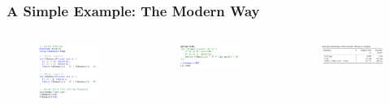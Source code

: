 \documentclass{beamer}
\begin{document}

\begin{frame}
\frametitle{A Simple Example: The Modern Way}
\begin{columns}
\begin{figure}[htb]
    \centering
    \includegraphics[width=1\textwidth]{new-way-2.png}
\end{figure} \pause
{}
\begin{figure}[htb]
    \centering
    \includegraphics[width=1\textwidth]{new-way-1.png}
\end{figure} \pause
\begin{figure}[htb]
    \centering
    \includegraphics[width=1\textwidth]{results.png}
\end{figure} \pause
\end{columns}
\end{frame}
\end{document}
